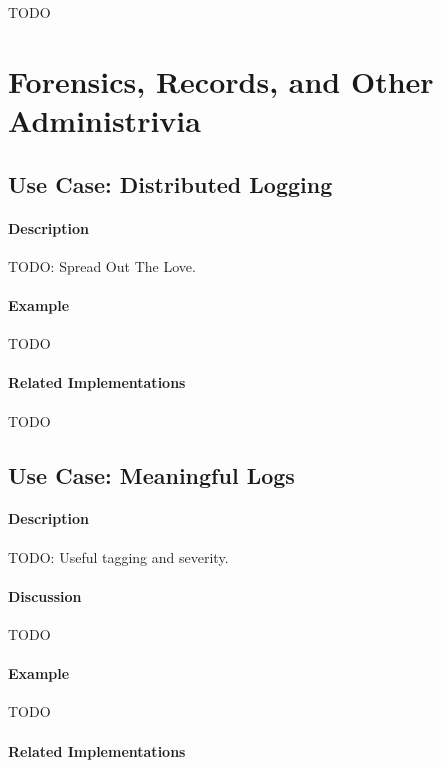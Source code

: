 {\Large TODO}

\section{Forensics, Records, and Other Administrivia}

\subsection{Use Case: Distributed Logging}

\paragraph{Description}

{\Large TODO:} Spread Out The Love.

\paragraph{Example}

{\Large TODO}

\paragraph{Related Implementations}

{\Large TODO}

\subsection{Use Case: Meaningful Logs}

\paragraph{Description}

{\Large TODO:} Useful tagging and severity.

\paragraph{Discussion}

{\Large TODO}

\paragraph{Example}

{\Large TODO}

\paragraph{Related Implementations}


